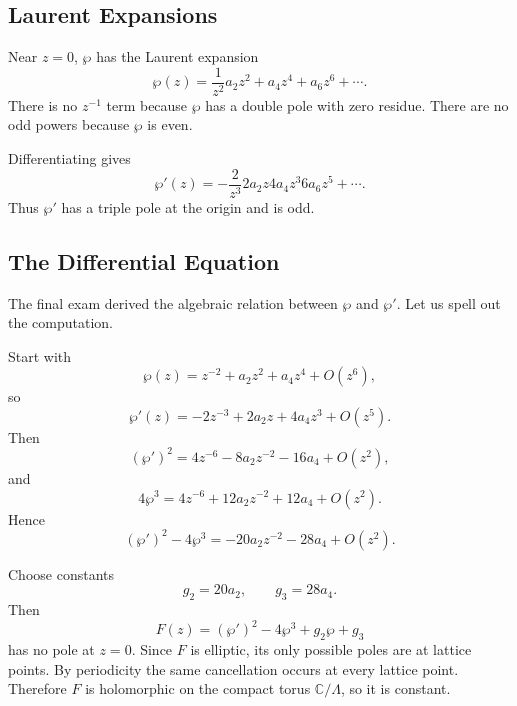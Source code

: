 \documentclass[11pt]{article}
\newcommand{\C}{\mathbb{C}}
\newcommand{\CP}{\mathbb{CP}}
\begin{document}
\begin{center}
\end{center}

\subsection{Laurent Expansions}

Near \(z=0\), \(\wp\) has the Laurent expansion
\[
\wp(z)=
\frac{1}{z^2}
a_2z^2+a_4z^4+a_6z^6+\cdots.
\]
There is no \(z^{-1}\) term because \(\wp\) has a double pole with zero
residue.  There are no odd powers because \(\wp\) is even.

Differentiating gives
\[
\wp'(z)
=
-\frac{2}{z^3}
2a_2z
4a_4z^3
6a_6z^5+\cdots.
\]
Thus \(\wp'\) has a triple pole at the origin and is odd.

\subsection{The Differential Equation}

The final exam derived the algebraic relation between \(\wp\) and \(\wp'\).
Let us spell out the computation.

Start with
\[
\wp(z)
=
z^{-2}+a_2z^2+a_4z^4+O(z^6),
\]
so
\[
\wp'(z)
=
-2z^{-3}+2a_2z+4a_4z^3+O(z^5).
\]
Then
\[
(\wp')^2
=
4z^{-6}-8a_2z^{-2}-16a_4+O(z^2),
\]
and
\[
4\wp^3
=
4z^{-6}+12a_2z^{-2}+12a_4+O(z^2).
\]
Hence
\[
(\wp')^2-4\wp^3
=
-20a_2z^{-2}-28a_4+O(z^2).
\]

Choose constants
\[
g_2=20a_2,
\qquad
g_3=28a_4.
\]
Then
\[
F(z)=(\wp')^2-4\wp^3+g_2\wp+g_3
\]
has no pole at \(z=0\).  Since \(F\) is elliptic, its only possible poles are
at lattice points.  By periodicity the same cancellation occurs at every
lattice point.  Therefore \(F\) is holomorphic on the compact torus
\(\C/\Lambda\), so it is constant.
\end{document}
